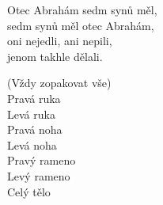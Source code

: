
\re{}Otec Abrahám sedm synů měl,\\
sedm synů měl otec Abrahám,\\
oni nejedli, ani nepili,\\
jenom takhle dělali.

\re{}(Vždy zopakovat vše)\\
Pravá ruka\\
Levá ruka\\
Pravá noha\\
Levá noha\\
Pravý rameno\\
Levý rameno\\
Celý tělo
\esong{}
